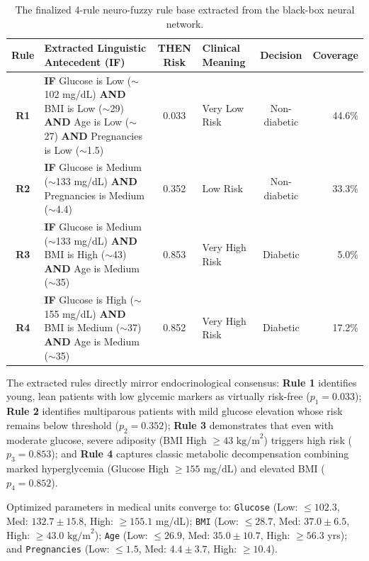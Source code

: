 \documentclass[12pt,a4paper,oneside]{report}
\begin{document}
\begin{table}[htbp]
\centering
\footnotesize
\renewcommand{\arraystretch}{0.75}
\setlength{\tabcolsep}{3pt}
\begin{tabularx}{\textwidth}{c X c l c r}
\toprule
\textbf{Rule} & \textbf{Extracted Linguistic Antecedent (IF)} & \textbf{THEN Risk} & \textbf{Clinical Meaning} & \textbf{Decision} & \textbf{Coverage} \\
\midrule
\textbf{R1} & \textbf{IF} Glucose is Low ($\sim$102 mg/dL) \textbf{AND} BMI is Low ($\sim$29) \textbf{AND} Age is Low ($\sim$27) \textbf{AND} Pregnancies is Low ($\sim$1.5) & 0.033 & Very Low Risk & Non-diabetic & 44.6\% \\
\midrule
\textbf{R2} & \textbf{IF} Glucose is Medium ($\sim$133 mg/dL) \textbf{AND} Pregnancies is Medium ($\sim$4.4) & 0.352 & Low Risk & Non-diabetic & 33.3\% \\
\midrule
\textbf{R3} & \textbf{IF} Glucose is Medium ($\sim$133 mg/dL) \textbf{AND} BMI is High ($\sim$43) \textbf{AND} Age is Medium ($\sim$35) & 0.853 & Very High Risk & Diabetic & 5.0\% \\
\midrule
\textbf{R4} & \textbf{IF} Glucose is High ($\sim$155 mg/dL) \textbf{AND} BMI is Medium ($\sim$37) \textbf{AND} Age is Medium ($\sim$35) & 0.852 & Very High Risk & Diabetic & 17.2\% \\
\bottomrule
\end{tabularx}
\caption[Finalized 4-Rule Neuro-Fuzzy Rule Base]{The finalized 4-rule neuro-fuzzy rule base extracted from the black-box neural network.}
\label{tab:final_rulebase}
\end{table}

The extracted rules directly mirror endocrinological consensus: \textbf{Rule 1} identifies young, lean patients with low glycemic markers as virtually risk-free ($p_1 = 0.033$); \textbf{Rule 2} identifies multiparous patients with mild glucose elevation whose risk remains below threshold ($p_2 = 0.352$); \textbf{Rule 3} demonstrates that even with moderate glucose, severe adiposity (BMI High $\ge 43\text{ kg/m}^2$) triggers high risk ($p_3 = 0.853$); and \textbf{Rule 4} captures classic metabolic decompensation combining marked hyperglycemia (Glucose High $\ge 155$ mg/dL) and elevated BMI ($p_4 = 0.852$).

Optimized parameters in medical units converge to: \texttt{Glucose} (Low: $\le 102.3$, Med: $132.7 \pm 15.8$, High: $\ge 155.1$ mg/dL); \texttt{BMI} (Low: $\le 28.7$, Med: $37.0 \pm 6.5$, High: $\ge 43.0\text{ kg/m}^2$); \texttt{Age} (Low: $\le 26.9$, Med: $35.0 \pm 10.7$, High: $\ge 56.3$ yrs); and \texttt{Pregnancies} (Low: $\le 1.5$, Med: $4.4 \pm 3.7$, High: $\ge 10.4$).
\end{document}
